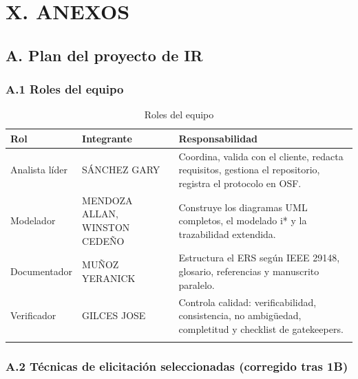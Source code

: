 
\nocite{*}



\section*{X. ANEXOS}


\subsection*{A. Plan del proyecto de IR}


\subsubsection*{A.1 Roles del equipo}


\begingroup
\small
\begin{longtable}{|p{5.2cm}|p{5.2cm}|p{5.2cm}|}
\hline
Rol & Integrante & Responsabilidad \\ \hline
Analista líder & SÁNCHEZ GARY & Coordina, valida con el cliente, redacta requisitos, gestiona el repositorio, registra el protocolo en OSF. \\ \hline
Modelador & MENDOZA ALLAN, WINSTON CEDEÑO & Construye los diagramas UML completos, el modelado i* y la trazabilidad extendida. \\ \hline
Documentador & MUÑOZ YERANICK & Estructura el ERS según IEEE 29148, glosario, referencias y manuscrito paralelo. \\ \hline
Verificador & GILCES JOSE & Controla calidad: verificabilidad, consistencia, no ambigüedad, completitud y checklist de gatekeepers. \\ \hline
\caption{Roles del equipo}
\end{longtable}
\endgroup

\subsubsection*{A.2 Técnicas de elicitación seleccionadas (corregido tras 1B)}


